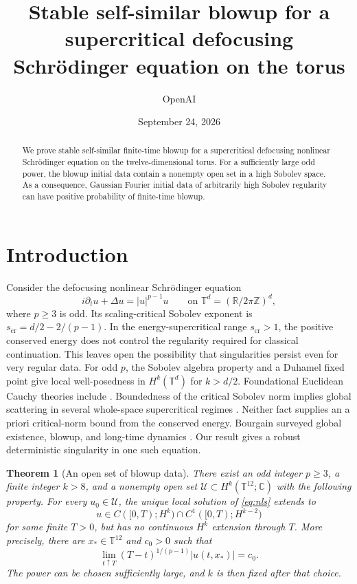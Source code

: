 \documentclass[11pt]{article}
\title{Stable self-similar blowup for a supercritical defocusing Schr\"odinger equation on the torus}
\author{OpenAI}
\date{September 24, 2026}
\numberwithin{equation}{section}
\newtheorem{theorem}{Theorem}[section]
\theoremstyle{definition}
\theoremstyle{remark}
\begin{document}
\begin{abstract}
We prove stable self-similar finite-time blowup for a supercritical
defocusing nonlinear Schr\"odinger equation on the twelve-dimensional
torus. For a sufficiently large odd power, the blowup initial data contain
a nonempty open set in a high Sobolev space. As a consequence, Gaussian
Fourier initial data of arbitrarily high Sobolev regularity can have
positive probability of finite-time blowup.
\end{abstract}

\section{Introduction}
\label{sec:introduction}

Consider the defocusing nonlinear Schr\"odinger equation
\begin{equation}\label{eq:nls}
 i\partial_tu+\Delta u=|u|^{p-1}u
 \qquad\text{on }\mathbb T^d=(\mathbb R/2\pi\mathbb Z)^d,
\end{equation}
where $p\geq3$ is odd. Its scaling-critical Sobolev exponent is
$s_{\mathrm{cr}}=d/2-2/(p-1)$. In the energy-supercritical range
$s_{\mathrm{cr}}>1$, the positive conserved energy does not control
the regularity required for classical continuation. This leaves open
the possibility that singularities persist even for very regular data.
For odd $p$, the Sobolev algebra property and a Duhamel fixed point give
local well-posedness in $H^k(\mathbb T^d)$ for $k>d/2$.
Foundational Euclidean Cauchy theories include
\cite{GinibreVelo1979,CazenaveWeissler1990}. Boundedness of the critical
Sobolev norm implies global scattering in several whole-space
supercritical regimes \cite{KillipVisan2010}. Neither fact
supplies an a priori critical-norm bound from the conserved energy.
Bourgain surveyed global existence, blowup, and long-time dynamics
\cite{Bourgain2000}. Our result gives a robust deterministic
singularity in one such equation.

\begin{theorem}[An open set of blowup data]\label{thm:blowup}
There exist an odd integer $p\geq3$, a finite integer $k>8$, and a
nonempty open set $\mathcal U\subset H^k(\mathbb T^{12};\mathbb C)$
with the following property. For every $u_0\in\mathcal U$, the unique
local solution of \eqref{eq:nls} extends to
\[
 u\in C([0,T);H^k)\cap C^1([0,T);H^{k-2})
\]
for some finite $T>0$, but has no continuous $H^k$ extension through $T$.
More precisely, there are $x_*\in\mathbb T^{12}$ and $c_0>0$ such that
\[
 \lim_{t\uparrow T}(T-t)^{1/(p-1)}|u(t,x_*)|=c_0.
\]
The power can be chosen sufficiently large, and $k$ is then fixed after
that choice.
\end{theorem}
\end{document}

